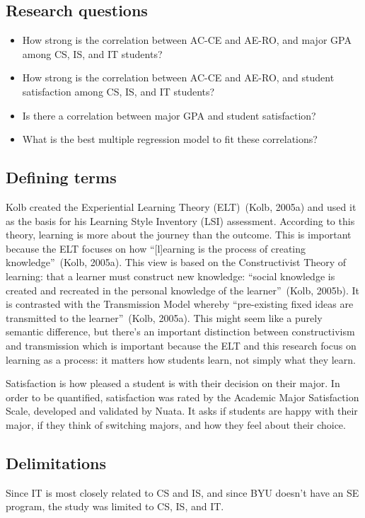 \subsection{Research questions}
\begin{itemize}
  \item How strong is the correlation between AC-CE and AE-RO, and major GPA among CS, IS, and IT students?
  \item How strong is the correlation between AC-CE and AE-RO, and student satisfaction among CS, IS, and IT students?
  \item Is there a correlation between major GPA and student satisfaction?
  \item What is the best multiple regression model to fit these correlations?
\end{itemize}

\subsection{Defining terms}
Kolb created the Experiential Learning Theory (ELT)~(Kolb, 2005a) and used it as the basis for his Learning Style Inventory (LSI) assessment. According to this theory, learning is more about the journey than the outcome. This is important because the ELT focuses on how ``[l]earning is the process of creating knowledge''~(Kolb, 2005a). This view is based on the Constructivist Theory of learning: that a learner must construct new knowledge: ``social knowledge is created and recreated in the personal knowledge of the learner''~(Kolb, 2005b). It is contrasted with the Transmission Model whereby ``pre-existing fixed ideas are transmitted to the learner''~(Kolb, 2005a). This might seem like a purely semantic difference, but there's an important distinction between constructivism and transmission which is important because the ELT and this research focus on learning as a process: it matters how students learn, not simply what they learn.

Satisfaction is how pleased a student is with their decision on their major. In order to be quantified, satisfaction was rated by the Academic Major Satisfaction Scale, developed and validated by Nuata. It asks if students are happy with their major, if they think of switching majors, and how they feel about their choice.

\subsection{Delimitations}
Since IT is most closely related to CS and IS, and since BYU doesn't have an SE program, the study was limited to CS, IS, and IT.

